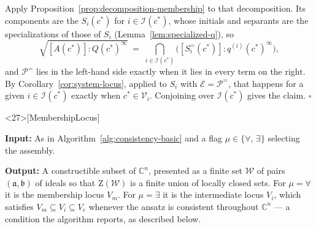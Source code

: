 \documentclass{article}
\theoremstyle{definition}
\theoremstyle{plain}
\newcommand{\qedbox}{\hspace*{\fill}\ensuremath{\square}}
\begin{document}
Apply Proposition~\ref{prop:decomposition-membership} to that decomposition.
Its components are the $S_i(c^*)$ for $i \in \mathcal{I}(c^*)$, whose initials
and separants are the specializations of those of $S_i$
(Lemma~\ref{lem:specialized-q}), so
%
\[
\sqrt{[A(c^*)] : Q(c^*)^\infty}
  \;=\; \bigcap_{i \in \mathcal{I}(c^*)}
        \bigl( [S^=_i(c^*)] : q^{(i)}(c^*)^\infty \bigr) ,
\]
%
and $\mathcal{P}^=$ lies in the left-hand side exactly when it lies in every
term on the right.  By Corollary~\ref{cor:system-locus}, applied to $S_i$ with
$\mathcal{E} = \mathcal{P}^=$, that happens for a given $i \in \mathcal{I}(c^*)$
exactly when $c^* \in \mathcal{V}_i$.  Conjoining over $\mathcal{I}(c^*)$ gives
the claim.
\qedbox

\vfill\eject

\begin{algorithm}<27>[MembershipLocus]
\label{alg:core-basic}
\mbox{}

{\bf Input:} As in Algorithm~\ref{alg:consistency-basic}
and a flag $\mu \in \{\forall, \, \exists\}$ selecting the assembly.

{\bf Output:} A constructible subset of $\mathbb{C}^n$, presented as a finite
set $\mathcal{W}$ of pairs $(\mathfrak{a}, \mathfrak{b})$ of ideals
so that $\mathrm{Z}(\mathcal{W})$ is a finite union
of locally closed sets.  For $\mu = \forall$ it is the
membership locus $V_m$.  For
$\mu = \exists$ it is the intermediate locus $V_i$, which
satisfies $V_m \subseteq V_i \subseteq V_c$ whenever
the ansatz is consistent throughout $\mathbb{C}^n$ --- a condition the algorithm
reports, as described below.


\end{algorithm}
\end{document}
